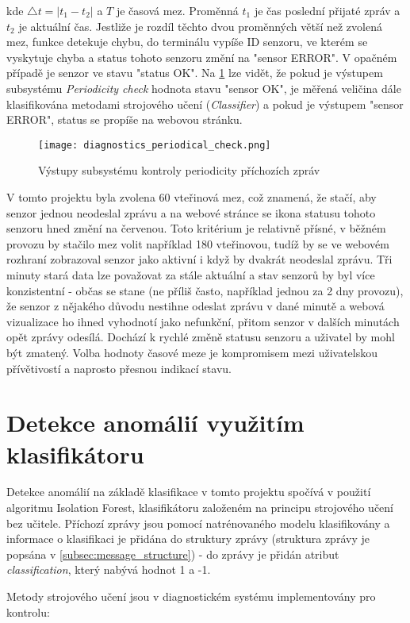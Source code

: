 kde \( \triangle t = |t_1 - t_2| \) a $T$ je časová mez. Proměnná $t_1$ je čas poslední přijaté zpráv a $t_2$ je aktuální čas. Jestliže je rozdíl těchto dvou proměnných větší než zvolená mez, funkce detekuje chybu, do terminálu vypíše ID senzoru, ve kterém se vyskytuje chyba a status tohoto senzoru změní na "sensor ERROR". V opačném případě je senzor ve stavu "status OK". Na \cref{fig:diagnostics_periodical_check} lze vidět, že pokud je výstupem subsystému \textit{Periodicity check} hodnota stavu "sensor OK", je měřená veličina dále klasifikována metodami strojového učení (\textit{Classifier}) a pokud je výstupem "sensor ERROR", status se propíše na webovou stránku.

\begin{figure}[H]
  \centering
  \texttt{[image: diagnostics\_periodical\_check.png]}
  \caption{Výstupy subsystému kontroly periodicity příchozích zpráv}
  \label{fig:diagnostics_periodical_check}
\end{figure} 

V tomto projektu byla zvolena 60 vteřinová mez, což znamená, že stačí, aby senzor jednou neodeslal zprávu a na webové stránce se ikona statusu tohoto senzoru hned změní na červenou. Toto kritérium je relativně přísné, v běžném provozu by stačilo mez volit například 180 vteřinovou, tudíž by se ve webovém rozhraní zobrazoval senzor jako aktivní i když by dvakrát neodeslal zprávu. Tři minuty stará data lze považovat za stále aktuální a stav senzorů by byl více konzistentní - občas se stane (ne příliš často, například jednou za 2 dny provozu), že senzor z nějakého důvodu nestihne odeslat zprávu v dané minutě a webová vizualizace ho ihned vyhodnotí jako nefunkční, přitom senzor v dalších minutách opět zprávy odesílá. Dochází k rychlé změně statusu senzoru a uživatel by mohl být zmatený. Volba hodnoty časové meze je kompromisem mezi uživatelskou přívětivostí a naprosto přesnou indikací stavu. 

\section{Detekce anomálií využitím klasifikátoru} \label{sec:classifier}
Detekce anomálií na základě klasifikace v tomto projektu spočívá v použití algoritmu Isolation Forest, klasifikátoru založeném na principu strojového učení bez učitele. Příchozí zprávy jsou pomocí natrénovaného modelu klasifikovány a informace o klasifikaci je přidána do struktury zprávy (struktura zprávy je popsána v \cref{subsec:message_structure}) - do zprávy je přidán atribut \textit{classification}, který nabývá hodnot 1 a -1. \par
Metody strojového učení jsou v diagnostickém systému implementovány pro kontrolu:

